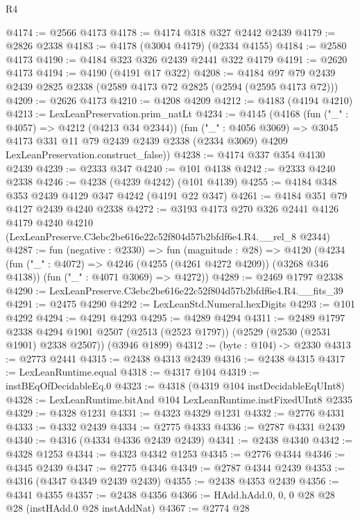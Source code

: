 \begin{lexlean}{R4}
\begin{coremodule}
@4174 := @2566 @4173
@4178 := @4174 @318 @327 @2442 @2439
@4179 := @2826 @2338
@4183 := @4178 (@3004 @4179) (@2334 @4155)
@4184 := @2580 @4173
@4190 := @4184 @323 @326 @2439 @2441 @322 @4179
@4191 := @2620 @4173
@4194 := @4190 (@4191 @17 @322)
@4208 := @4184 @97 @79 @2439 @2439 @2825 @2338 (@2589 @4173 @72 @2825 (@2594 (@2595 @4173 @72)))
@4209 := @2626 @4173
@4210 := @4208 @4209
@4212 := @4183 (@4194 @4210)
@4213 := LexLeanPreservation.prim_natLt
@4234 := @4145
    (@4168
      (fun ("_" : @4057) => @4212 (@4213 @34 @2344))
      (fun ("_" : @4056 @3069) =>
      @3045
        @4173
        @331
        @11
        @79
        @2439
        @2439
        @2338
        (@2334 @3069)
        @4209
        LexLeanPreservation.construct_false))
@4238 := @4174 @337 @354 @4130 @2439
@4239 := @2333 @347
@4240 := @101 @4138
@4242 := @2333 @4240 @2338
@4246 := @4238 (@4239 @4242) (@101 @4139)
@4255 := @4184 @348 @353 @2439 @4129 @347 @4242 (@4191 @22 @347)
@4261 := @4184 @351 @79 @4127 @2439 @4240 @2338
@4272 := @3193
    @4173
    @270
    @326
    @2441
    @4126
    @4179
    @4240
    @4210
    (LexLeanPreserve.C3ebc2be616e22c52f804d57b2bfdf6e4.R4.__rel_8 @2344)
@4287 := fun (negative : @2330) =>
  fun (magnitude : @28) =>
  @4120
    (@4234
      (fun ("_" : @4072) => @4246 (@4255 (@4261 @4272 @4209)) (@3268 @346 @4138))
      (fun ("_" : @4071 @3069) => @4272))
@4289 := @2469 @1797 @2338
@4290 := LexLeanPreserve.C3ebc2be616e22c52f804d57b2bfdf6e4.R4.__fits_39
@4291 := @2475 @4290
@4292 := LexLeanStd.Numeral.hexDigits
@4293 := @101 @4292
@4294 := @4291 @4293
@4295 := @4289 @4294
@4311 := @2489
    @1797
    @2338
    @4294
    @1901
    @2507
    (@2513 (@2523 @1797))
    (@2529 (@2530 (@2531 @1901) @2338 @2507))
    (@3946 @1899)
@4312 := (byte : @104) -> @2330
@4313 := @2773 @2441
@4315 := @2438 @4313 @2439
@4316 := @2438 @4315
@4317 := LexLeanRuntime.equal
@4318 := @4317 @104
@4319 := instBEqOfDecidableEq.{0}
@4323 := @4318 (@4319 @104 instDecidableEqUInt8)
@4328 := LexLeanRuntime.bitAnd @104 LexLeanRuntime.instFixedUInt8 @2335
@4329 := @4328 @1231
@4331 := @4323 @4329 @1231
@4332 := @2776 @4331
@4333 := @4332 @2439
@4334 := @2775 @4333
@4336 := @2787 @4331 @2439
@4340 := @4316 (@4334 @4336 @2439 @2439)
@4341 := @2438 @4340
@4342 := @4328 @1253
@4344 := @4323 @4342 @1253
@4345 := @2776 @4344
@4346 := @4345 @2439
@4347 := @2775 @4346
@4349 := @2787 @4344 @2439
@4353 := @4316 (@4347 @4349 @2439 @2439)
@4355 := @2438 @4353 @2439
@4356 := @4341 @4355
@4357 := @2438 @4356
@4366 := HAdd.hAdd.{0, 0, 0} @28 @28 @28 (instHAdd.{0} @28 instAddNat)
@4367 := @2774 @28

\end{coremodule}
\end{lexlean}

